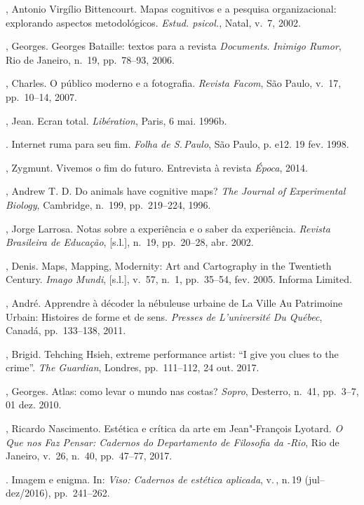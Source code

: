 \begin{bibliohedra}
, Antonio Virgílio Bittencourt. Mapas cognitivos e a
pesquisa organizacional: explorando aspectos metodológicos. \emph{Estud. psicol.}, Natal, v.~7, 2002.

, Georges. Georges Bataille: textos para a revista \emph{Documents}.
\emph{Inimigo Rumor}, Rio de Janeiro, n.~19, pp.~78--93, 2006.

, Charles. O público moderno e a fotografia. \emph{Revista
Facom}, São Paulo, v.~17, pp.~10--14, 2007.

, Jean. Ecran total. \emph{Libération}, Paris, 6 mai. 1996b.

\tit{\_\_\_\_\_\_}. Internet ruma para seu fim. \emph{Folha de S.\,Paulo}, São Paulo, p. e12. 19 fev. 1998.


, Zygmunt. Vivemos o fim do futuro. Entrevista à revista
\emph{Época}, 2014. 

, Andrew T. D. Do animals have cognitive maps? \emph{The
Journal of Experimental Biology}, Cambridge, n.~199, pp.~219--224, 1996.

, Jorge Larrosa. Notas sobre a experiência e o saber da
experiência. \emph{Revista Brasileira de Educação}, {[}s.l.{]}, n.~19,
pp.~20--28, abr. 2002.

, Denis. Maps, Mapping, Modernity: Art and Cartography in the
Twentieth Century. \emph{Imago Mundi}, {[}s.l.{]}, v.~57, n.~1,
pp.~35--54, fev. 2005. Informa  Limited.

, André. Apprendre à décoder la nébuleuse urbaine de La
Ville Au Patrimoine Urbain: Histoires de forme et de sens. \emph{Presses de
L'université Du Québec}, Canadá, pp.~133--138, 2011.

, Brigid. Tehching Hsieh, extreme performance artist: ``I give
you clues to the crime''. \emph{The Guardian}, Londres, pp.~111--112, 24
out. 2017.

, Georges. Atlas: como levar o mundo nas costas?
\emph{Sopro}, Desterro, n.~41, pp.~3--7, 01 dez. 2010. 

, Ricardo Nascimento. Estética e crítica da arte em
Jean"-François Lyotard. \emph{O Que nos Faz Pensar: Cadernos do
Departamento de Filosofia da -Rio}, Rio de Janeiro, v.~26, n.~40,
pp.~47--77, 2017.

\tit{\_\_\_\_\_\_}. Imagem e enigma. In: \emph{Viso: Cadernos de estética aplicada}, v.\,, n.\,19 (jul--dez/2016), pp.~241--262.


\end{bibliohedra}
